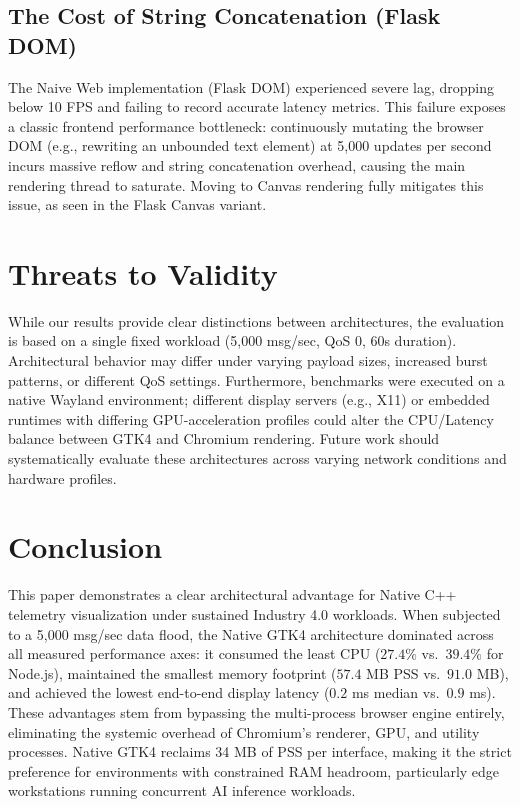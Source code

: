\documentclass[lettersize,journal]{IEEEtran}
\begin{document}
\subsection{The Cost of String Concatenation (Flask DOM)}
The Naive Web implementation (Flask DOM) experienced severe lag, dropping below 10 FPS and failing to record accurate latency metrics. This failure exposes a classic frontend performance bottleneck: continuously mutating the browser DOM (e.g., rewriting an unbounded text element) at 5,000 updates per second incurs massive reflow and string concatenation overhead, causing the main rendering thread to saturate. Moving to Canvas rendering fully mitigates this issue, as seen in the Flask Canvas variant.

\section{Threats to Validity}
While our results provide clear distinctions between architectures, the evaluation is based on a single fixed workload (5,000 msg/sec, QoS 0, 60s duration). Architectural behavior may differ under varying payload sizes, increased burst patterns, or different QoS settings. Furthermore, benchmarks were executed on a native Wayland environment; different display servers (e.g., X11) or embedded runtimes with differing GPU-acceleration profiles could alter the CPU/Latency balance between GTK4 and Chromium rendering. Future work should systematically evaluate these architectures across varying network conditions and hardware profiles.

\section{Conclusion}
This paper demonstrates a clear architectural advantage for Native C++ telemetry visualization under sustained Industry 4.0 workloads. When subjected to a 5,000 msg/sec data flood, the Native GTK4 architecture dominated across all measured performance axes: it consumed the least CPU ($27.4\%$ vs.\ $39.4\%$ for Node.js), maintained the smallest memory footprint ($57.4$ MB PSS vs.\ $91.0$ MB), and achieved the lowest end-to-end display latency ($0.2$ ms median vs.\ $0.9$ ms). These advantages stem from bypassing the multi-process browser engine entirely, eliminating the systemic overhead of Chromium's renderer, GPU, and utility processes. Native GTK4 reclaims 34 MB of PSS per interface, making it the strict preference for environments with constrained RAM headroom, particularly edge workstations running concurrent AI inference workloads.
\end{document}
